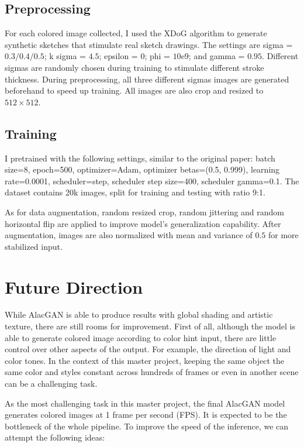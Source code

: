 \subsection{Preprocessing}
For each colored image collected, I used the XDoG\cite{winnemollerXDoGEXtendedDifferenceofGaussians2012} algorithm to generate synthetic sketches that stimulate real sketch drawings. The settings are sigma = $0.3/0.4/0.5$; k sigma = $4.5$; epsilon = $0$; phi = $10\mathrm{e}9$; and gamma = $0.95$. Different sigmas are randomly chosen during training to stimulate different stroke thickness. During preprocessing, all three different sigmas images are generated beforehand to speed up training. All images are also crop and resized to $512\times512$.

\subsection{Training}
I pretrained with the following settings, similar to the original paper: batch size=8, epoch=500, optimizer=Adam, optimizer betas=(0.5, 0.999), learning rate=0.0001, scheduler=step, scheduler step size=400, scheduler gamma=0.1. The dataset contains 20k images, split for training and testing with ratio 9:1.

As for data augmentation, random resized crop, random jittering and random horizontal flip are applied to improve model's generalization capability. After augmentation, images are also normalized with mean and variance of $0.5$ for more stabilized input.


\section{Future Direction}
While AlacGAN is able to produce results with global shading and artistic texture, there are still rooms for improvement. First of all, although the model is able to generate colored image according to color hint input, there are little control over other aspects of the output. For example, the direction of light and color tones. In the context of this master project, keeping the same object the same color and styles constant across hundreds of frames or even in another scene can be a challenging task.

As the most challenging task in this master project, the final AlacGAN model generates colored images at 1 frame per second (FPS). It is expected to be the bottleneck of the whole pipeline. To improve the speed of the inference, we can attempt the following ideas:

